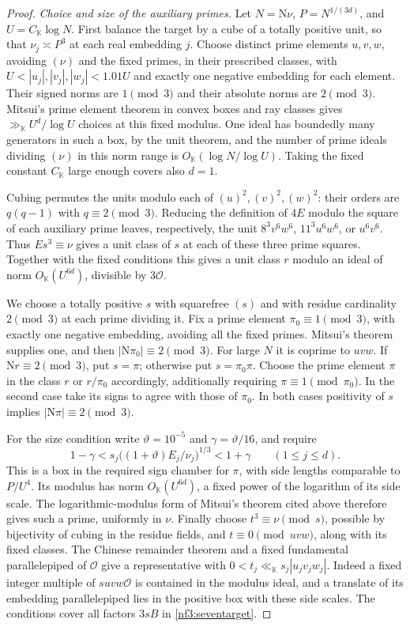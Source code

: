 \documentclass[11pt,letterpaper]{article}
\theoremstyle{definition}
\numberwithin{equation}{section}
\begin{document}
\begin{proof}
\smallskip\noindent
\emph{Choice and size of the auxiliary primes.}
Let $N=\mathrm N\nu$, $P=N^{1/(3d)}$, and $U=C_{\mathbb K}\log N$.
First balance the target by a cube of a totally positive unit, so
that $\nu_j\asymp P^3$ at each real embedding $j$. Choose distinct
prime elements $u,v,w$, avoiding $(\nu)$ and the fixed primes,
in their prescribed classes, with
$U<|u_j|,|v_j|,|w_j|<1.01U$ and exactly one negative embedding
for each element. Their signed norms are $1\pmod3$ and their
absolute norms are $2\pmod3$. Mitsui's prime element theorem in
convex boxes and ray classes \cite[Theorem~1.2.1]{nf3:kai} gives
$\gg_{\mathbb K}U^d/\log U$ choices at this fixed modulus. One ideal
has boundedly many generators in such a box, by the unit theorem,
and the number of prime ideals dividing $(\nu)$ in this norm range
is $O_{\mathbb K}(\log N/\log U)$. Taking the fixed constant
$C_{\mathbb K}$ large enough covers also $d=1$.

Cubing permutes the units modulo each of $(u)^2,(v)^2,(w)^2$:
their orders are $q(q-1)$ with $q\equiv2\pmod3$. Reducing the
definition of $4E$ modulo the square of each auxiliary prime leaves,
respectively, the unit $8^3v^6w^6$, $11^3u^6w^6$, or $u^6v^6$.
Thus $Es^3\equiv\nu$ gives a unit class of $s$ at each of these
three prime squares. Together with the fixed conditions this gives
a unit class $r$ modulo an ideal of norm $O_{\mathbb K}(U^{6d})$,
divisible by $3\mathcal O$.

We choose a totally positive $s$ with squarefree $(s)$ and with
residue cardinality $2\pmod3$ at each prime dividing it. Fix a prime
element $\pi_0\equiv1\pmod3$, with exactly one negative
embedding, avoiding all the fixed primes. Mitsui's theorem supplies
one, and then $|\mathrm N\pi_0|\equiv2\pmod3$. For large $N$ it
is coprime to $uvw$. If $\mathrm N r\equiv2\pmod3$, put
$s=\pi$; otherwise put $s=\pi_0\pi$. Choose the prime element
$\pi$ in the class $r$ or $r/\pi_0$ accordingly, additionally
requiring $\pi\equiv1\pmod{\pi_0}$. In the second case take its
signs to agree with those of $\pi_0$. In both cases positivity
of $s$ implies $|\mathrm N\pi|\equiv2\pmod3$.

For the size condition write $\vartheta=10^{-5}$ and
$\gamma=\vartheta/16$, and require
\[
  1-\gamma< s_j\big((1+\vartheta)E_j/\nu_j\big)^{1/3}<1+\gamma
       \qquad(1\le j\le d).
\]
This is a box in the required sign chamber for $\pi$, with side
lengths comparable to $P/U^4$. Its modulus has norm
$O_{\mathbb K}(U^{6d})$, a fixed power of the logarithm of its side
scale. The logarithmic-modulus form of Mitsui's theorem cited above
therefore gives such a prime, uniformly in $\nu$. Finally choose
$t^3\equiv\nu\pmod s$, possible by bijectivity of cubing in the
residue fields, and $t\equiv0\pmod{uvw}$, along with its fixed
classes. The Chinese remainder theorem and a fixed fundamental
parallelepiped of $\mathcal O$ give a representative with
$0<t_j\ll_{\mathbb K}s_j|u_jv_jw_j|$. Indeed a fixed integer
multiple of $suvw\mathcal O$ is contained in the modulus ideal,
and a translate of its embedding parallelepiped lies in the
positive box with these side scales. The conditions cover all
factors $3sB$ in \eqref{nf3:seventarget}.


\end{proof}
\end{document}
